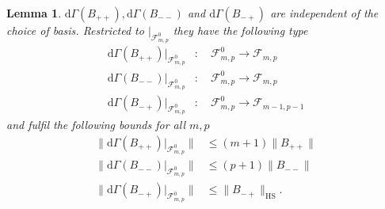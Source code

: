 \documentclass[b5paper,draft,openbib,12pt]{memoir}
\newtheorem{Lemma}[Def]{Lemma}
\begin{document}
\begin{Lemma}
\(\mathrm{d}\Gamma(B_{++}),\mathrm{d}\Gamma(B_{--})\) and \(\mathrm{d}\Gamma(B_{-+})\) are independent of the choice of basis. 
Restricted to \(|_{\mathcal{F}^0_{m,p}}\) they have the following type
\begin{align}
\mathrm{d}\Gamma(B_{++})|_{\mathcal{F}^0_{m,p}}&: \quad \mathcal{F}^0_{m,p} \rightarrow \mathcal{F}_{m,p}\\
\mathrm{d}\Gamma(B_{--})|_{\mathcal{F}^0_{m,p}}&: \quad \mathcal{F}^0_{m,p} \rightarrow \mathcal{F}_{m,p}\\
\mathrm{d}\Gamma(B_{-+})|_{\mathcal{F}^0_{m,p}}&: \quad \mathcal{F}^0_{m,p} \rightarrow \mathcal{F}_{m-1,p-1}
\end{align}
 and fulfil
the following bounds for all \(m,p\)
\begin{align}
\|\mathrm{d}\Gamma(B_{++})|_{\mathcal{F}^0_{m,p}}\|&\le (m+1)\|B_{++}\|\\
\|\mathrm{d}\Gamma(B_{--})|_{\mathcal{F}^0_{m,p}}\|&\le (p+1)\|B_{--}\|\\
\|\mathrm{d}\Gamma(B_{-+})|_{\mathcal{F}^0_{m,p}}\|&\le \|B_{-+}\|_{\text{HS}}.
\end{align}
\end{Lemma}
\end{document}
